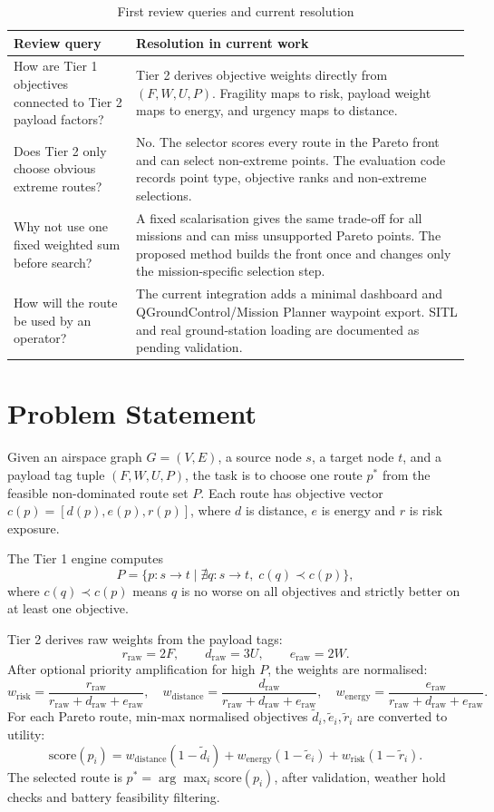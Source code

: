 \documentclass{ssnreview}
\newcommand{\tagtuple}{(F,W,U,P)}
\newcommand{\riskweight}{w_{\mathrm{risk}}}
\newcommand{\distweight}{w_{\mathrm{distance}}}
\newcommand{\energyweight}{w_{\mathrm{energy}}}
\begin{document}
\begin{table}[H]
\centering
\caption{First review queries and current resolution}
\label{tab:first-review}
\begin{tabularx}{\textwidth}{p{}X}
\toprule
\textbf{Review query} & \textbf{Resolution in current work} \\
\midrule
How are Tier 1 objectives connected to Tier 2 payload factors? &
Tier 2 derives objective weights directly from \(\tagtuple\). Fragility maps to risk, payload weight maps to
energy, and urgency maps to distance. \\
\addlinespace
Does Tier 2 only choose obvious extreme routes? &
No. The selector scores every route in the Pareto front and can select non-extreme points. The evaluation code
records point type, objective ranks and non-extreme selections. \\
\addlinespace
Why not use one fixed weighted sum before search? &
A fixed scalarisation gives the same trade-off for all missions and can miss unsupported Pareto points. The proposed
method builds the front once and changes only the mission-specific selection step. \\
\addlinespace
How will the route be used by an operator? &
The current integration adds a minimal dashboard and QGroundControl/Mission Planner waypoint export. SITL and real
ground-station loading are documented as pending validation. \\
\bottomrule
\end{tabularx}
\end{table}

\chapter{Problem Statement}
Given an airspace graph \(G=(V,E)\), a source node \(s\), a target node \(t\), and a payload tag tuple
\(\tagtuple\), the task is to choose one route \(p^*\) from the feasible non-dominated route set \(P\). Each route
has objective vector \(c(p)=[d(p),e(p),r(p)]\), where \(d\) is distance, \(e\) is energy and \(r\) is risk exposure.

The Tier 1 engine computes
\[
P=\{p:s\rightarrow t \mid \nexists q:s\rightarrow t,\; c(q) \prec c(p)\},
\]
where \(c(q) \prec c(p)\) means \(q\) is no worse on all objectives and strictly better on at least one objective.

Tier 2 derives raw weights from the payload tags:
\[
r_{\mathrm{raw}}=2F,\qquad d_{\mathrm{raw}}=3U,\qquad e_{\mathrm{raw}}=2W.
\]
After optional priority amplification for high \(P\), the weights are normalised:
\[
\riskweight=\frac{r_{\mathrm{raw}}}{r_{\mathrm{raw}}+d_{\mathrm{raw}}+e_{\mathrm{raw}}},
\quad
\distweight=\frac{d_{\mathrm{raw}}}{r_{\mathrm{raw}}+d_{\mathrm{raw}}+e_{\mathrm{raw}}},
\quad
\energyweight=\frac{e_{\mathrm{raw}}}{r_{\mathrm{raw}}+d_{\mathrm{raw}}+e_{\mathrm{raw}}}.
\]
For each Pareto route, min-max normalised objectives \(\tilde d_i,\tilde e_i,\tilde r_i\) are converted to utility:
\[
\mathrm{score}(p_i)=
\distweight(1-\tilde d_i)+
\energyweight(1-\tilde e_i)+
\riskweight(1-\tilde r_i).
\]
The selected route is \(p^*=\arg\max_i \mathrm{score}(p_i)\), after validation, weather hold checks and battery
feasibility filtering.
\end{document}
